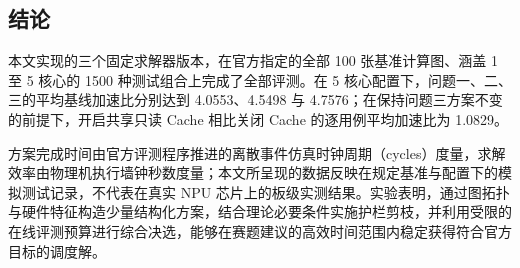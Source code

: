 \documentclass[anonymous,notoc]{gmcm2026}
\begin{document}
\subsection{结论}

本文实现的三个固定求解器版本，在官方指定的全部 100 张基准计算图、涵盖 1 至 5 核心的 1500 种测试组合上完成了全部评测。在 5 核心配置下，问题一、二、三的平均基线加速比分别达到 4.0553、4.5498 与 4.7576；在保持问题三方案不变的前提下，开启共享只读 Cache 相比关闭 Cache 的逐用例平均加速比为 1.0829。

方案完成时间由官方评测程序推进的离散事件仿真时钟周期（cycles）度量，求解效率由物理机执行墙钟秒数度量；本文所呈现的数据反映在规定基准与配置下的模拟测试记录，不代表在真实 NPU 芯片上的板级实测结果。实验表明，通过图拓扑与硬件特征构造少量结构化方案，结合理论必要条件实施护栏剪枝，并利用受限的在线评测预算进行综合决选，能够在赛题建议的高效时间范围内稳定获得符合官方目标的调度解。
\end{document}
